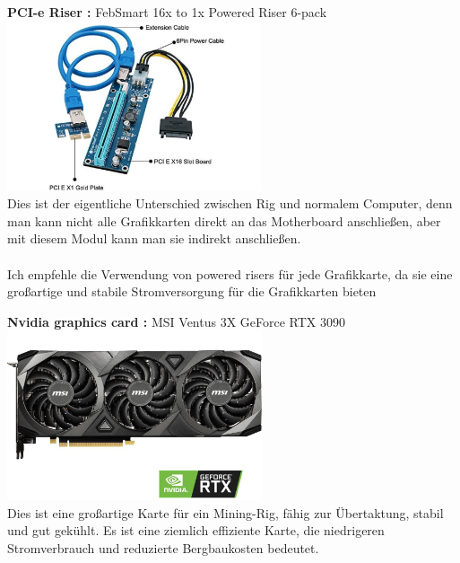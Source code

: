 \documentclass[ngerman]{scrreprt}
\begin{document}
\begin{large}
	\textbf{PCI-e Riser :} FebSmart 16x to 1x Powered Riser 6-pack \\ 
	\includegraphics[width=\linewidth,height=5cm]{pci}  \\
	Dies ist der eigentliche Unterschied zwischen Rig und normalem Computer, denn man kann nicht alle Grafikkarten direkt an das Motherboard anschließen, aber mit diesem Modul kann man sie indirekt anschließen.\\ \\
	
	Ich empfehle die Verwendung von powered risers für jede Grafikkarte, da sie eine großartige und stabile Stromversorgung für die Grafikkarten bieten \\ 
	
	
\end{large}
\begin{large}
	\textbf{Nvidia graphics card :} MSI Ventus 3X GeForce RTX 3090
	 \\ 
	\includegraphics[width=\linewidth,height=5cm]{graphic}  \\
	Dies ist eine großartige Karte für ein Mining-Rig, fähig zur Übertaktung, stabil und gut gekühlt. Es ist eine ziemlich effiziente Karte, die niedrigeren Stromverbrauch und reduzierte Bergbaukosten bedeutet. \\ 
	
	
\end{large}

\end{document}
